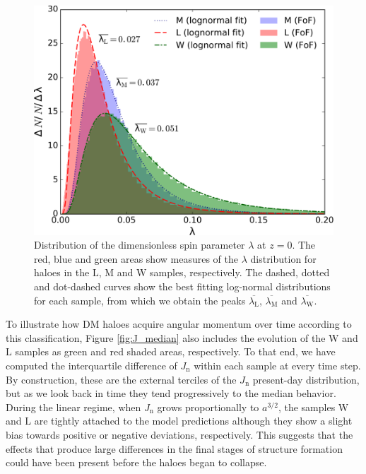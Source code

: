 \documentclass[fleqn,usenatbib]{mnras}
\newcommand{\Wh}{\mathrm{W}}
\newcommand{\Lh}{\mathrm{L}}
\newcommand{\Mh}{\mathrm{M}}
\begin{document}
\begin{figure}
	\includegraphics[width=\columnwidth]{400Mpc_figs/sp_distr_color.pdf}
    \caption{Distribution of the dimensionless spin parameter $\lambda$ at $z=0$. The red, blue and green areas show measures of the $\lambda$ distribution for haloes in the $\Lh$, $\Mh$ and $\Wh$ samples, respectively. The dashed, dotted and dot-dashed curves show the best fitting log-normal distributions for each sample, from which we obtain the peaks $\overline{\lambda_\mathrm{L}}$, $\overline{\lambda_\mathrm{M}}$ and $\overline{\lambda_\mathrm{W}}$.}
    \label{fig:gp_spinparameter}
\end{figure}

To illustrate how DM haloes acquire angular momentum over time according to this classification, Figure \ref{fig:J_median} also includes the evolution of the $\Wh$ and $\Lh$ samples as green and red shaded areas, respectively. To that end, we have computed the interquartile difference of $J_\mathrm{n}$ within each sample at every time step. By construction, these are the external terciles of the $J_\mathrm{n}$ present-day distribution, but as we look back in time they tend progressively to the median behavior. During the linear regime, when $J_\mathrm{n}$ grows proportionally to $a^{3/2}$, the samples $\Wh$ and $\Lh$ are tightly attached to the model predictions although they show a slight bias towards positive or negative deviations, respectively. This suggests that the effects that produce large differences in the final stages of structure formation could have been present before the haloes began to collapse.
\end{document}
